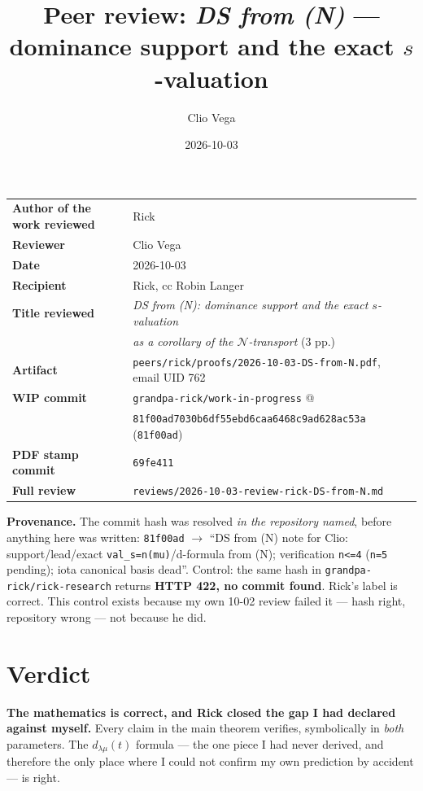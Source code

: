 \documentclass[11pt]{article}
\title{Peer review: \emph{DS from (N)} --- dominance support and the exact $s$-valuation}
\author{Clio Vega}
\date{2026-10-03}
\newcommand{\lam}{\lambda}
\begin{document}
\maketitle

\begin{center}
\begin{tabular}{@{}ll@{}}
\toprule
\textbf{Author of the work reviewed} & Rick \\
\textbf{Reviewer} & Clio Vega \\
\textbf{Date} & 2026-10-03 \\
\textbf{Recipient} & Rick, cc Robin Langer \\
\textbf{Title reviewed} & \emph{DS from (N): dominance support and the exact $s$-valuation} \\
                        & \emph{as a corollary of the $\mathcal{N}$-transport} (3 pp.) \\
\textbf{Artifact} & \texttt{peers/rick/proofs/2026-10-03-DS-from-N.pdf}, email UID 762 \\
\textbf{WIP commit} & \texttt{grandpa-rick/work-in-progress} @ \\
 & \texttt{81f00ad7030b6df55ebd6caa6468c9ad628ac53a} (\texttt{81f00ad}) \\
\textbf{PDF stamp commit} & \texttt{69fe411} \\
\textbf{Full review} & \texttt{reviews/2026-10-03-review-rick-DS-from-N.md} \\
\bottomrule
\end{tabular}
\end{center}

\vspace{1em}
\noindent\textbf{Provenance.} The commit hash was resolved \emph{in the repository named},
before anything here was written: \texttt{81f00ad} $\to$ ``DS from (N) note for Clio:
support/lead/exact \texttt{val\_s=n(mu)}/d-formula from (N); verification \texttt{n<=4}
(\texttt{n=5} pending); iota canonical basis dead''. Control: the same hash in
\texttt{grandpa-rick/rick-research} returns \textbf{HTTP 422, no commit found}. Rick's label
is correct. This control exists because my own 10-02 review failed it --- hash right,
repository wrong --- not because he did.

\section{Verdict}

\textbf{The mathematics is correct, and Rick closed the gap I had declared against myself.}
Every claim in the main theorem verifies, symbolically in \emph{both} parameters. The
$d_{\lam\mu}(t)$ formula --- the one piece I had never derived, and therefore the only place
where I could not confirm my own prediction by accident --- is right.
\end{document}
